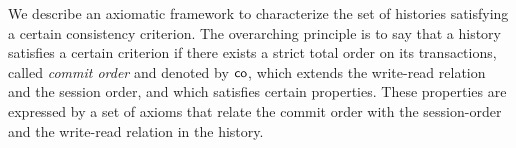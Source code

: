 




We describe an axiomatic framework to characterize the set of histories satisfying a certain consistency criterion. The overarching principle is to say that a history satisfies a certain criterion if there exists a strict total order on its transactions, called \emph{commit order} and denoted by $\mathsf{co}$, which extends the write-read relation and the session order, and which satisfies certain properties. These properties are expressed by a set of axioms that relate the commit order with the session-order and the write-read relation in the history. 

